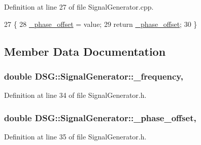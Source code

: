 Definition at line 27 of file Signal\-Generator.\-cpp.


\begin{DoxyCode}
27                                                                 \{
28     \hyperlink{classDSG_1_1SignalGenerator_a9abf9d00c798e0fdca6314f17547758a}{\_phase\_offset} = value;
29     \textcolor{keywordflow}{return} \hyperlink{classDSG_1_1SignalGenerator_a9abf9d00c798e0fdca6314f17547758a}{\_phase\_offset};
30 \}
\end{DoxyCode}


\subsection{Member Data Documentation}
\hypertarget{classDSG_1_1SignalGenerator_a67e296e3506dcdf09402c667cddff9ac}{
\subsubsection[{\-\_\-frequency}]{\setlength{\rightskip}{0pt plus 5cm}double D\-S\-G\-::\-Signal\-Generator\-::\-\_\-frequency\hspace{0.3cm}{\ttfamily [protected]}, {\ttfamily [inherited]}}}\label{classDSG_1_1SignalGenerator_a67e296e3506dcdf09402c667cddff9ac}


Definition at line 34 of file Signal\-Generator.\-h.

\hypertarget{classDSG_1_1SignalGenerator_a9abf9d00c798e0fdca6314f17547758a}{
\subsubsection[{\-\_\-phase\-\_\-offset}]{\setlength{\rightskip}{0pt plus 5cm}double D\-S\-G\-::\-Signal\-Generator\-::\-\_\-phase\-\_\-offset\hspace{0.3cm}{\ttfamily [protected]}, {\ttfamily [inherited]}}}\label{classDSG_1_1SignalGenerator_a9abf9d00c798e0fdca6314f17547758a}


Definition at line 35 of file Signal\-Generator.\-h.

